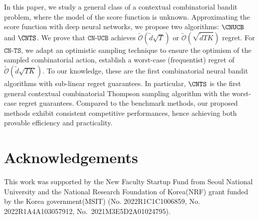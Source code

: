 \documentclass{article}
\theoremstyle{plain}
\begin{document}
In this paper, we study a general class of a contextual combinatorial bandit problem, where the model of the score function is unknown. 
Approximating the score function with deep neural networks, we propose two algorithms: $\CNUCB$ and $\CNTS$.  
We prove that $\texttt{CN-UCB}$ achieves $\tilde{\mathcal{O}}(\tilde{d} \sqrt{T})$ or $\tilde{\mathcal{O}}(\sqrt{\tilde{d} T K})$ regret.
For $\texttt{CN-TS}$, we adapt an optimistic sampling technique to ensure the optimism of the sampled combinatorial action, establish a worst-case (frequentist) regret of $\tilde{\mathcal{O}}(\tilde{d} \sqrt{TK})$.
To our knowledge, these are the first combinatorial neural bandit algorithms with sub-linear regret guarantees.
In particular, $\CNTS$ is the first general contextual combinatorial Thompson sampling algorithm  with the  worst-case regret guarantees.
Compared to the benchmark methods, our proposed methods exhibit consistent competitive performances, hence achieving both provable efficiency and practicality.


\section*{Acknowledgements}
This work was supported by the New Faculty Startup Fund from Seoul National University and the National Research Foundation of Korea(NRF) grant funded by the Korea government(MSIT) (No. 2022R1C1C1006859, No. 2022R1A4A103057912, No.~2021M3E5D2A01024795).
\end{document}
